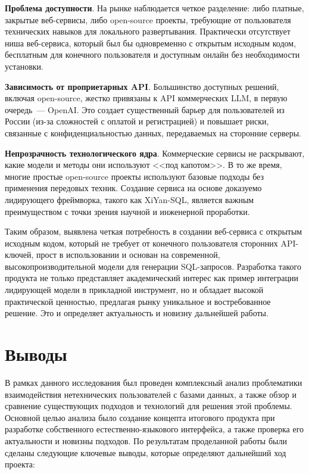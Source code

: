 \begin{compactitem}
	\item \textbf{Проблема доступности}. На рынке наблюдается четкое разделение:
	либо платные, закрытые веб-сервисы, либо open-source проекты,
	требующие от пользователя технических навыков для локального развертывания.
	Практически отсутствует ниша веб-сервиса, который был бы одновременно
	с открытым исходным кодом, бесплатным для конечного пользователя и доступным онлайн
	без необходимости установки.
	\item \textbf{Зависимость от проприетарных API}. Большинство доступных решений,
	включая open-source, жестко привязаны к API коммерческих LLM, в первую очередь~--- OpenAI.
	Это создает существенный барьер для пользователей из России
	(из-за сложностей с оплатой и регистрацией) и повышает риски,
	связанные с конфиденциальностью данных, передаваемых на сторонние серверы.
	\item \textbf{Непрозрачность технологического ядра}. Коммерческие сервисы не раскрывают,
	какие модели и методы они используют <<под капотом>>. В то же время,
	многие простые open-source проекты используют базовые подходы без применения передовых техник.
	Создание сервиса на основе доказуемо лидирующего фреймворка, такого как XiYan-SQL,
	является важным преимуществом с точки зрения научной и инженерной проработки.
\end{compactitem}

Таким образом, выявлена четкая потребность в создании веб-сервиса с открытым исходным кодом,
который не требует от конечного пользователя сторонних API-ключей,
прост в использовании и основан на современной, высокопроизводительной модели для
генерации SQL-запросов. Разработка такого продукта не только представляет
академический интерес как пример интеграции лидирующей модели в прикладной инструмент,
но и обладает высокой практической ценностью, предлагая рынку уникальное и востребованное решение.
Это и определяет актуальность и новизну дальнейшей работы.




\section{Выводы}

В рамках данного исследования был проведен комплексный анализ проблематики
взаимодействия нетехнических пользователей с базами данных,
а также обзор и сравнение существующих подходов и технологий для решения этой проблемы.
Основной целью анализа было создание концепта итогового продукта при
разработке собственного естественно-языкового интерфейса, а также проверка его актуальности и
новизны подходов.
По результатам проделанной работы
были сделаны следующие ключевые выводы, которые определяют дальнейший ход проекта:

